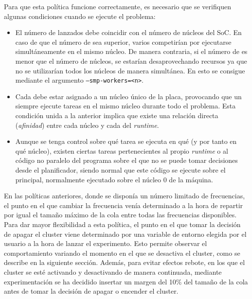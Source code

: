 Para que esta política funcione correctamente, es necesario que se verifiquen algunas
condiciones cuando se ejecute el problema:

\begin{itemize}
\item El número de \wts lanzados debe coincidir con el número de núcleos del
  SoC. En caso de que el número de \wts sea superior, varios \wts
  competirían por ejecutarse simultáneamente en el mismo núcleo. De manera
  contraria, si el número de \wts es menor que el número de núcleos, se
  estarían desaprovechando recursos ya que no se utilizarían todos los
  núcleos de manera simultánea. En \nanos esto se consigue mediante el
  argumento \texttt{--smp-workers=<n>}.
\item Cada \wt debe estar asignado a un núcleo único de la placa,
  provocando que un \wt siempre ejecute tareas en el mismo núcleo durante
  todo el problema. Esta condición unida a la anterior implica que existe
  una relación directa ({\em afinidad}) entre cada núcleo y cada \wt del
  \emph{runtime}.
\item Aunque se tenga control sobre qué tarea se ejecuta en qué \wt (y por
  tanto en qué núcleo), existen ciertas tareas pertenecientes al propio
  \emph{runtime} o al código no paralelo del programa sobre el que no se
  puede tomar decisiones desde el planificador, siendo normal que este
  código se ejecute sobre el \wt principal, normalmente ejecutado sobre el
  núcleo 0 de la máquina.
\end{itemize}


En las políticas anteriores, donde se disponía un número limitado de
frecuencias, el punto en el que cambiar la frecuencia venía determinado a
la hora de repartir por igual el tamaño máximo de la cola entre todas las
frecuencias disponibles. Para dar mayor flexibilidad a esta política, el
punto en el que tomar la decisión de apagar el cluster viene determinado
por una variable de entorno elegida por el usuario a la hora de lanzar el
experimento. Esto permite observar el comportamiento variando el momento en
el que se desactiva el cluster, como se describe en la siguiente
sección. Además, para evitar efectos rebote, en los que el cluster se esté
activando y desactivando de manera continuada, mediante experimentación se
ha decidido insertar un margen del 10\% del tamaño de la cola antes de
tomar la decisión de apagar o encender el cluster.

